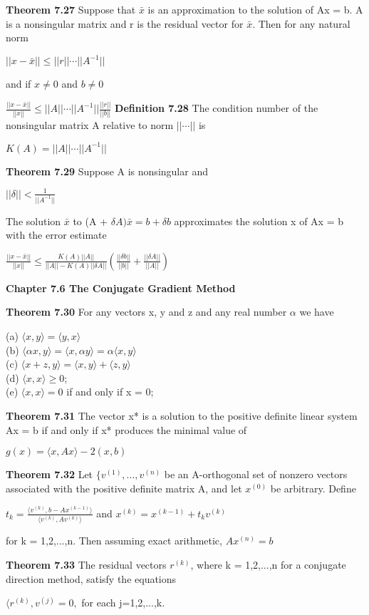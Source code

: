 \documentclass{article}
\begin{document}
\textbf {Theorem 7.27} Suppose that $\bar{x}$ is an approximation to the solution of Ax = b. A is a nonsingular matrix and r is the residual vector for $\bar{x}$. Then for any natural norm
\begin{center}
$||x-\bar{x}|| \leq ||r|| \cdots ||A^{-1}||$
\end{center}
and if $x \neq 0$ and $b \neq 0$
\begin{center}
$\frac{||x-\bar{x}||}{||x||} \leq ||A|| \cdots ||A^{-1}|| \frac{||r||}{||b||}$
\textbf {Definition 7.28} The condition number of the nonsingular matrix A relative to norm $|| \cdots ||$ is 
\begin{center}
$K(A) = ||A|| \cdots ||A^{-1}||$
\end{center}

\textbf {Theorem 7.29} Suppose A is nonsingular and
\begin{center}
$||\delta|| < \frac{1}{||A^{-1}||}$
\end{center}
The solution $\bar{x}$ to (A + $\delta A) \bar{x} = b + \delta b$ approximates the solution x of Ax = b with the error estimate
\begin{center}
$\frac{||x-\bar{x}||}{||x||} \leq \frac{K(A)||A||}{||A|| - K(A)||\delta A||} (\frac{||\delta b||}{||b||} + \frac {||\delta A||}{||A||})$ 
\end{center}

\textbf {Chapter 7.6 The Conjugate Gradient Method}

\textbf {Theorem 7.30} For any vectors x, y and z and any real number $\alpha$ we have
\begin{center}
(a) $\langle  x, y \rangle = \langle y, x \rangle$ \\
(b) $\langle \alpha x, y \rangle = \langle x , \alpha y \rangle = \alpha \langle x, y \rangle$ \\
(c) $ \langle x + z, y \rangle = \langle x, y \rangle + \langle z , y \rangle$ \\
(d) $\langle x, x \rangle \geq 0$; \\
(e) $\langle x, x \rangle = 0$ if and only if x = 0;
\end{center}

\textbf {Theorem 7.31} The vector x* is a solution to the positive definite linear system Ax = b if and only if x* produces the minimal value of 
\begin{center}
$g(x) = \langle x, Ax \rangle - 2(x, b)$
\end{center}

\textbf {Theorem 7.32} Let $\{v^{(1)} ,..., v^{(n)}$ be an A-orthogonal set of nonzero vectors associated with the positive definite matrix A, and let $x^{(0)}$ be arbitrary. Define 
\begin{center}
$t_k = \frac{\langle v^{(k)} , b - Ax^{(k-1)}\rangle}{ \langle v^{(k)}, Av^{(k)} \rangle}$ and $x^{(k)} = x^{(k-1)} + t_k v^{(k)}$
\end{center}
for k = 1,2,...,n. Then assuming exact arithmetic, $Ax^{(n)} = b$

\textbf {Theorem 7.33} The residual vectors $r^{(k)}$, where k = 1,2,...,n for a conjugate direction method, satisfy the equations 
\begin{center}
$\langle r^{(k)} , v^{(j)} = 0,$ for each j=1,2,...,k.
\end{center}
\end{center}
\end{document}
